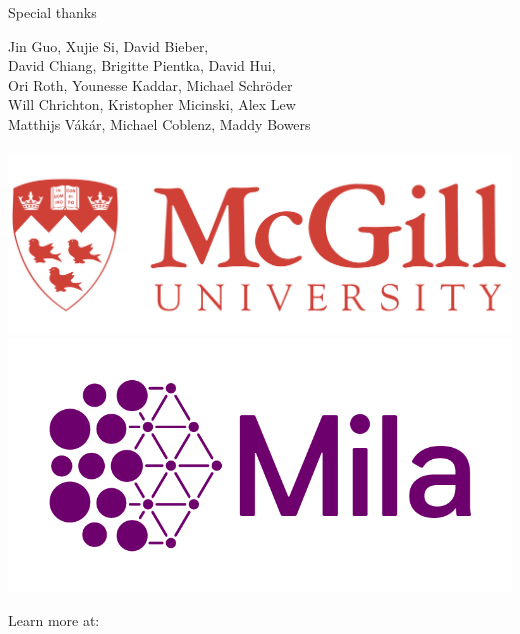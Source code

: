 \documentclass{beamer}
\begin{document}
\begin{frame}{Special thanks}
  \begin{center}
    \LARGE{
      Jin Guo, Xujie Si, David Bieber,\\
      David Chiang, Brigitte Pientka, David Hui,\\
      Ori Roth, Younesse Kaddar, Michael Schröder\\
      Will Chrichton, Kristopher Micinski, Alex Lew\\
      Matthijs Vákár, Michael Coblenz, Maddy Bowers\\
      \phantom{}\\
    }
    \href{https://cs.mcgill.ca}{\includegraphics[scale=0.06]{../figures/mcgill_logo.png}}
    \href{https://mila.quebec}{\includegraphics[scale=0.1]{../figures/mila_logo.png}}
  \end{center}
\end{frame}

\begin{frame}
  \begin{center}
    \huge{Learn more at: \\~\\
    \href{https://tidyparse.github.io}{\color{blue}{https://tidyparse.github.io}}}
  \end{center}
\end{frame}
\end{document}
